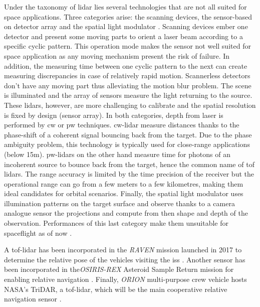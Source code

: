 Under the taxonomy of \gls{lidar} lies several technologies that are not all suited for space applications. Three categories arise: the scanning devices, the sensor-based on detector array and the spatial light modulator \citep{blais_review_2004, crosby_multiphase_2011, kirmani_exploiting_2011}. Scanning devices ember one detector and present some moving parts to orient a laser beam according to a specific cyclic pattern. This operation mode makes the sensor not well suited for space application as any moving mechanism present the risk of failure. In addition, the measuring time between one cyclic pattern to the next can create measuring discrepancies in case of relatively rapid motion. Scannerless detectors don't have any moving part thus alleviating the motion blur problem. The scene is illuminated and the array of sensors measure the light returning to the source. These \gls{lidar}s, however, are more challenging to calibrate and the spatial resolution is fixed by design (sensor array). In both categories, depth from laser is performed by \gls{cw} or \gls{pw} techniques. \gls{cw}-\gls{lidar} measure distances thanks to the phase-shift of a coherent signal bouncing back from the target. Due to the phase ambiguity problem, this technology is typically used for close-range applications (below 15m). \gls{pw}-\gls{lidar}s on the other hand measure time for photons of an incoherent source to bounce back from the target, hence the common name of \gls{tof} \gls{lidar}s. The range accuracy is limited by the time precision of the receiver but the operational range can go from a few meters to a few kilometres, making them ideal candidates for orbital scenarios. Finally, the spatial light modulator uses illumination patterns on the target surface and observe thanks to a camera analogue sensor the projections and compute from then shape and depth of the observation. Performances of this last category make them unsuitable for spaceflight as of now \citep{opromolla_review_2017}.

A \gls{tof}-\gls{lidar} has been incorporated in the \emph{RAVEN} mission launched in 2017 to determine the relative pose of the vehicles visiting the \gls{iss} \citep{strube_raven:_nodate}. Another sensor has been incorporated in the\emph{OSIRIS-REX} Asteroid Sample Return mission for enabling relative navigation \citep{lauretta_osiris-rex_2015}. Finally, \emph{ORION} multi-purpose crew vehicle hosts NASA's TriDAR, a \gls{tof}-\gls{lidar}, which will be the main cooperative relative navigation sensor \citep{roback_helicopter_2013}.

